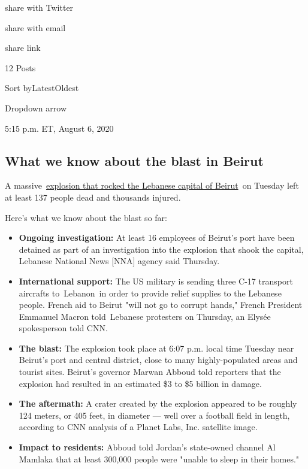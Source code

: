share with Twitter

share with email

share link

12 Posts

Sort byLatestOldest

Dropdown arrow

5:15 p.m. ET, August 6, 2020

\hypertarget{what-we-know-about-the-blast-in-beirut}{%
\subsection{What we know about the blast in
Beirut}\label{what-we-know-about-the-blast-in-beirut}}

A
massive~\href{https://cnn.com/2020/08/05/middleeast/beirut-port-explosion-ammonium-nitrate-intl-hnk/index.html}{explosion
that rocked the Lebanese capital of Beirut}~on Tuesday left at least 137
people dead and thousands injured.

Here's what we know about the blast so far:

\begin{itemize}
\tightlist
\item
  \textbf{Ongoing investigation:} At least 16 employees of Beirut's port
  have been detained as part of an investigation into the explosion that
  shook the capital, Lebanese National News {[}NNA{]} agency said
  Thursday.
\item
  \textbf{International support:} The US military is sending three C-17
  transport aircrafts to~Lebanon~in order to provide relief supplies to
  the Lebanese people. French aid to Beirut "will not go to corrupt
  hands," French President Emmanuel Macron told~Lebanese protesters on
  Thursday, an Elysée spokesperson told CNN.
\item
  \textbf{The blast:} The explosion took place at 6:07 p.m. local time
  Tuesday near Beirut's port and central district, close to many
  highly-populated areas and tourist sites. Beirut's governor Marwan
  Abboud told reporters that the explosion had resulted in an estimated
  \$3 to \$5 billion in damage.
\item
  \textbf{The aftermath:} A crater created by the explosion appeared to
  be roughly 124 meters, or 405 feet, in diameter --- well over a
  football field in length, according to CNN analysis of a Planet Labs,
  Inc. satellite image.
\item
  \textbf{Impact to residents:} Abboud told Jordan's state-owned channel
  Al Mamlaka that at least 300,000 people were "unable to sleep in their
  homes."
\end{itemize}

